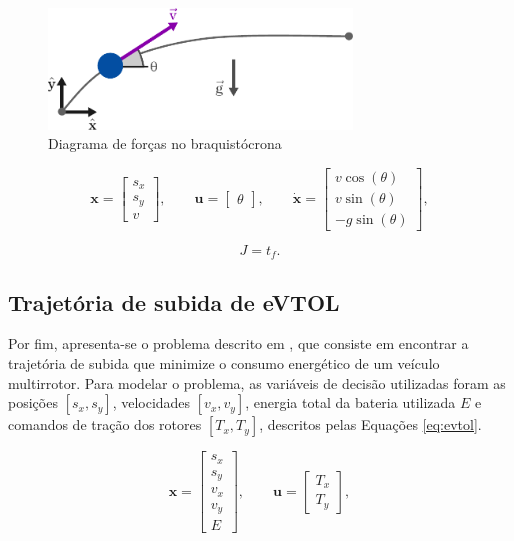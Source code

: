\begin{figure}[H]
    \centering
    \includegraphics[width=0.72\textwidth]{Cap3/figuras/brachistochrone.pdf}
    \caption{Diagrama de forças no braquistócrona}
    \label{fig:braquistocrona}
\end{figure}

\begin{equation}
    \mathbf{x} = \begin{bmatrix}
        s_x \\
        s_y \\
        v
    \end{bmatrix},
    \qquad
    \mathbf{u} = \begin{bmatrix}
        \theta
    \end{bmatrix},
    \qquad
    \dot{\mathbf{x}} = \begin{bmatrix}
        v \cos(\theta) \\
        v \sin(\theta) \\
        -g \sin(\theta)
    \end{bmatrix},
    \label{eq:braquistocrona}
\end{equation}

\begin{equation}
    J = t_f.
    \label{eq:braquistocrona-J}
\end{equation}


\subsection{Trajetória de subida de eVTOL}
\label{subsec:evtol}

Por fim, apresenta-se o problema descrito em \cite{costa_otimizacao_2023}, que consiste em encontrar a trajetória de subida que minimize o consumo energético de um veículo multirrotor. Para modelar o problema, as variáveis de decisão utilizadas foram as posições $[s_x, s_y]$, velocidades $[v_x, v_y]$, energia total da bateria utilizada $E$ e comandos de tração dos rotores $[T_x, T_y]$, descritos pelas Equações \ref{eq:evtol}.

\begin{equation}
    \mathbf{x} = \begin{bmatrix}
        s_x \\
        s_y \\
        v_x \\
        v_y \\
        E
    \end{bmatrix},
    \qquad
    \mathbf{u} = \begin{bmatrix}
        T_x \\
        T_y
    \end{bmatrix},
    \label{eq:evtol}
\end{equation}

